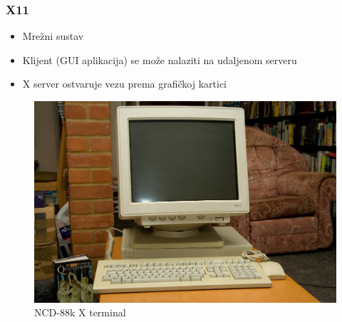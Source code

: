 \documentclass[t,table,usenames,dvipsnames]{beamer}
\begin{document}
\begin{frame}
\begin{figure}[h]
\begin{minipage}{0.25\textwidth}
		\end{minipage}
	\end{figure}
\end{frame}


\begin{frame}
	\frametitle{X11}
	\begin{itemize}
		\item Mrežni sustav
		\item Klijent (GUI aplikacija) se može nalaziti na udaljenom serveru
		\item X server ostvaruje vezu prema grafičkoj kartici
	\end{itemize}
	\begin{figure}
		\begin{minipage}{0.4\textwidth}
			\raggedleft
			\includegraphics[width=\linewidth]{Xterminal.jpg}
			\caption*{NCD-88k X terminal}
		\end{minipage}
		\begin{minipage}{0.25\textwidth}
			\raggedright

\end{minipage}
\end{figure}
\end{frame}
\end{document}
